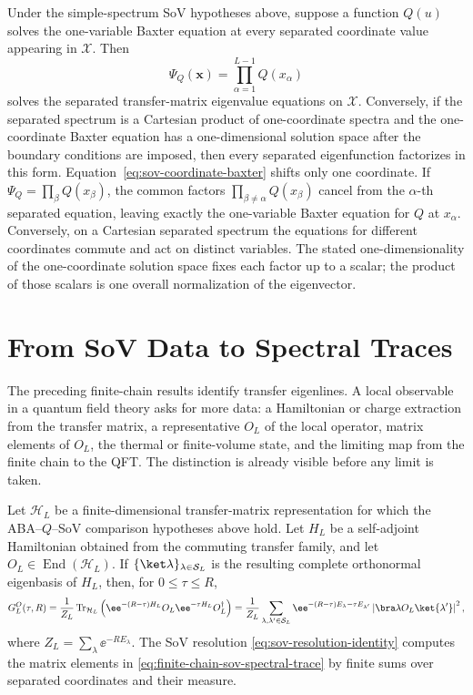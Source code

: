 Under the simple-spectrum SoV hypotheses above, suppose a
function \(Q(u)\) solves the one-variable Baxter equation at every separated
coordinate value appearing in \(\mathcal X\).  Then
\[
  \Psi_Q(\boldsymbol x)=\prod_{\alpha=1}^{L-1}Q(x_\alpha)
\]
solves the separated transfer-matrix eigenvalue equations on
\(\mathcal X\).  Conversely, if the separated spectrum is a Cartesian product
of one-coordinate spectra and the one-coordinate Baxter equation has a
one-dimensional solution space after the boundary conditions are imposed,
then every separated eigenfunction factorizes in this form.
Equation~\eqref{eq:sov-coordinate-baxter} shifts only one coordinate.  If
\(\Psi_Q=\prod_\beta Q(x_\beta)\), the common factors
\(\prod_{\beta\ne\alpha}Q(x_\beta)\) cancel from the \(\alpha\)-th separated
equation, leaving exactly the one-variable Baxter equation for \(Q\) at
\(x_\alpha\).  Conversely, on a Cartesian separated spectrum the equations
for different coordinates commute and act on distinct variables.  The stated
one-dimensionality of the one-coordinate solution space fixes each factor up
to a scalar; the product of those scalars is one overall normalization of
the eigenvector.

\section{From SoV Data to Spectral Traces}
\label{sec:sov-spectral-trace-reconstruction}

The preceding finite-chain results identify transfer eigenlines.  A local
observable in a quantum field theory asks for more data: a Hamiltonian or
charge extraction from the transfer matrix, a representative \(O_L\) of the
local operator, matrix elements of \(O_L\), the thermal or finite-volume
state, and the limiting map from the finite chain to the QFT.  The distinction
is already visible before any limit is taken.

\begin{proposition}
\label{prop:finite-chain-sov-spectral-trace}
Let \(\mathcal H_L\) be a finite-dimensional transfer-matrix representation
for which the ABA--\(Q\)--SoV comparison hypotheses above hold.  Let
\(H_L\) be a self-adjoint Hamiltonian obtained from the commuting transfer
family, and let \(O_L\in\operatorname{End}(\mathcal H_L)\).  If
\(\{\ket\lambda\}_{\lambda\in\mathcal S_L}\) is the resulting complete
orthonormal eigenbasis of \(H_L\), then, for \(0\le\tau\le R\),
\begin{equation}
  G_L^{O}(\tau,R)
  =
  \frac{1}{Z_L}
  \operatorname{Tr}_{\mathcal H_L}
  \left(
    \ee^{-(R-\tau)H_L}O_L\ee^{-\tau H_L}O_L^\dagger
  \right)
  =
  \frac{1}{Z_L}
  \sum_{\lambda,\lambda'\in\mathcal S_L}
  \ee^{-(R-\tau)E_\lambda-\tau E_{\lambda'}}
  \left|\bra\lambda O_L\ket{\lambda'}\right|^2,
  \label{eq:finite-chain-sov-spectral-trace}
\end{equation}
where \(Z_L=\sum_{\lambda}\ee^{-R E_\lambda}\).  The SoV resolution
\eqref{eq:sov-resolution-identity} computes the matrix elements in
\eqref{eq:finite-chain-sov-spectral-trace} by finite sums over separated
coordinates and their measure.
\end{proposition}

